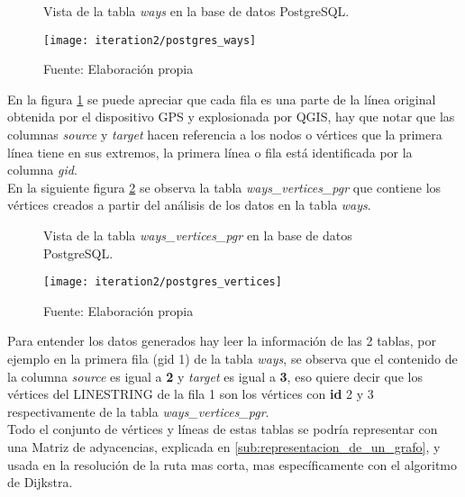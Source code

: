        \begin{figure}[H]
         \begin{center}
           \caption{Vista de la tabla \emph{ways} en la base de datos PostgreSQL.}
           \label{fig:postgres_ways}
           \texttt{[image: iteration2/postgres\_ways]}
           \caption*{Fuente: Elaboración propia}
         \end{center}
       \end{figure}

       En la figura \ref{fig:postgres_ways} se puede apreciar que cada fila es una parte de la línea original obtenida por el dispositivo GPS y explosionada por QGIS, hay que notar que las columnas \emph{source} y \emph{target} hacen referencia a los nodos o vértices que la primera línea tiene en sus extremos, la primera línea o fila está identificada por la columna \emph{gid}.\\

       En la siguiente figura \ref{fig:postgres_vertices} se observa la tabla \emph{ways\_vertices\_pgr} que contiene los vértices creados a partir del análisis de los datos en la tabla \emph{ways}.

       \begin{figure}[H]
         \begin{center}
           \caption{Vista de la tabla \emph{ways\_vertices\_pgr} en la base de datos PostgreSQL.}
           \label{fig:postgres_vertices}
           \texttt{[image: iteration2/postgres\_vertices]}
           \caption*{Fuente: Elaboración propia}
         \end{center}
       \end{figure}

       Para entender los datos generados hay leer la información de las 2 tablas, por ejemplo en la primera  fila (gid 1) de la tabla \emph{ways}, se observa que el contenido de la columna \emph{source} es igual a \textbf{2} y \emph{target} es igual a \textbf{3}, eso quiere decir que los vértices del LINESTRING de la fila 1 son los vértices con \textbf{id} 2 y 3 respectivamente de la tabla \emph{ways\_vertices\_pgr}.\\


       Todo el conjunto de vértices y líneas de estas tablas se podría representar con una Matriz de adyacencias, explicada en \ref{sub:representacion_de_un_grafo}, y usada en la resolución de la ruta mas corta, mas específicamente con el algoritmo de Dijkstra.\\


